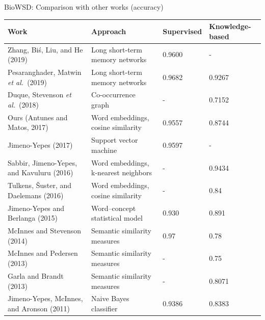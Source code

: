 \begin{frame}[t]{BioWSD: Comparison with other works (accuracy)}

\centering
\fontsize{7.0pt}{8.4pt}\selectfont


\renewcommand*{\arraystretch}{1.1}

\newcommand{\etal}{\textit{et al.}}
\newcommand{\z}{\hphantom{0}}
\begin{tabular}{D{48mm}D{43mm}G{12mm}G{20mm}}


Work & Approach & Supervised & Knowledge-based\\

\midrule

Zhang, Biś, Liu, and He (2019)             & Long short-term memory networks & 0.9600 & -\\
Pesaranghader, Matwin \etal\ (2019)        & Long short-term memory networks & 0.9682 & 0.9267\\
Duque, Stevenson \etal\ (2018)             & Co-occurrence graph & - & 0.7152\\
\alert{Ours (Antunes and Matos, 2017)}     & \alert{Word embeddings, cosine similarity} & \alert{0.9557} & \alert{0.8744}\\
Jimeno-Yepes (2017)                        & Support vector machine & 0.9597 & -\\
Sabbir, Jimeno-Yepes, and Kavuluru (2016)  & Word embeddings, k-nearest neighbors & - & 0.9434\\
Tulkens, Šuster, and Daelemans (2016)      & Word embeddings, cosine similarity & - & 0.84\z\z\\
Jimeno-Yepes and Berlanga (2015)           & Word--concept statistical model & 0.930\z & 0.891\z\\
McInnes and Stevenson (2014)               & Semantic similarity measures & 0.97\z\z & 0.78\z\z\\
McInnes and Pedersen (2013)                & Semantic similarity measures & - & 0.75\z\z\\
Garla and Brandt (2013)                    & Semantic similarity measures & - & 0.8071\\
Jimeno-Yepes, McInnes, and Aronson (2011)  & Naive Bayes classifier & 0.9386 & 0.8383\\


\end{tabular}

\end{frame}
